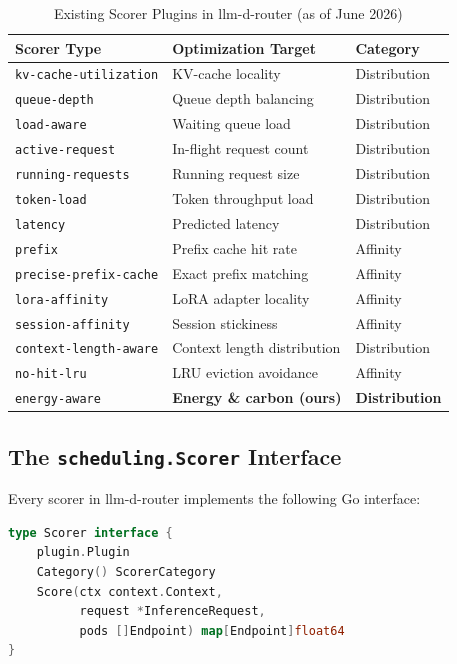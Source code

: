 \begin{table}[htbp]
\centering
\caption{Existing Scorer Plugins in llm-d-router (as of June 2026)}
\label{tab:existing-scorers}
\begin{tabular}{lll}
\toprule
\textbf{Scorer Type} & \textbf{Optimization Target} & \textbf{Category} \\
\midrule
\texttt{kv-cache-utilization} & KV-cache locality & Distribution \\
\texttt{queue-depth} & Queue depth balancing & Distribution \\
\texttt{load-aware} & Waiting queue load & Distribution \\
\texttt{active-request} & In-flight request count & Distribution \\
\texttt{running-requests} & Running request size & Distribution \\
\texttt{token-load} & Token throughput load & Distribution \\
\texttt{latency} & Predicted latency & Distribution \\
\texttt{prefix} & Prefix cache hit rate & Affinity \\
\texttt{precise-prefix-cache} & Exact prefix matching & Affinity \\
\texttt{lora-affinity} & LoRA adapter locality & Affinity \\
\texttt{session-affinity} & Session stickiness & Affinity \\
\texttt{context-length-aware} & Context length distribution & Distribution \\
\texttt{no-hit-lru} & LRU eviction avoidance & Affinity \\
\midrule
\texttt{energy-aware} & \textbf{Energy \& carbon (ours)} & \textbf{Distribution} \\
\bottomrule
\end{tabular}
\end{table}

\subsection{The \texttt{scheduling.Scorer} Interface}
\label{subsec:scorer-interface}

Every scorer in llm-d-router implements the following Go interface:

\begin{lstlisting}[language=Go, caption={The \texttt{scheduling.Scorer} interface from \texttt{llm-d-router/pkg/epp/framework/interface/scheduling/plugins.go}}, label={lst:scorer-interface}]
type Scorer interface {
    plugin.Plugin
    Category() ScorerCategory
    Score(ctx context.Context,
          request *InferenceRequest,
          pods []Endpoint) map[Endpoint]float64
}
\end{lstlisting}

